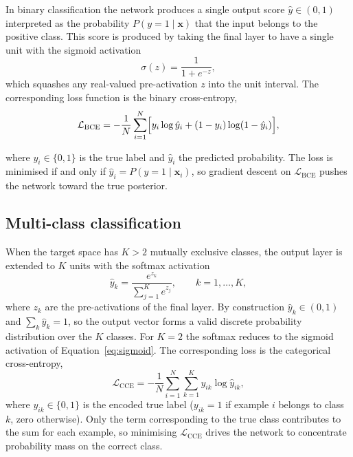 In binary classification the network produces a single output score $\hat{y}\in(0,1)$ interpreted as the probability $P(y=1\mid\mathbf{x})$ that the input belongs to the positive class.  This score is produced by taking the final layer to have a single unit with the sigmoid activation
\begin{equation}
\sigma(z) = \frac{1}{1+e^{-z}},
\label{eq:sigmoid}
\end{equation}
which squashes any real-valued pre-activation $z$ into the unit interval.  The corresponding loss function is the binary cross-entropy,
\begin{equation}
\mathcal{L}_{\mathrm{BCE}} = -\frac{1}{N}\sum_{i=1}^{N} \Bigl[ y_{i}\log\hat{y}_{i} + (1-y_{i})\log(1-\hat{y}_{i}) \Bigr],
\label{eq:bce}
\end{equation}

where $y_i\in\{0,1\}$ is the true label and $\hat{y}_i$ the predicted probability.  The loss is minimised if and only if $\hat{y}_i = P(y=1\mid\mathbf{x}_i)$, so gradient descent on $\mathcal{L}_{\mathrm{BCE}}$ pushes the network toward the true posterior.

\subsection{Multi-class classification}
\label{sec:multiclass}

When the target space has $K>2$ mutually exclusive classes, the output layer is extended to $K$ units with the softmax activation
\begin{equation}
\hat{y}_{k} = \frac{e^{z_{k}}}{\sum_{j=1}^{K}e^{z_{j}}}, \qquad k=1,\dots,K,
\label{eq:softmax}
\end{equation}
where $z_k$ are the pre-activations of the final layer.  By construction $\hat{y}_k\in(0,1)$ and $\sum_k\hat{y}_k=1$, so the output vector forms a valid discrete probability distribution over the $K$ classes.  For $K=2$ the softmax reduces to the sigmoid activation of Equation~\eqref{eq:sigmoid}.  The corresponding loss is the categorical cross-entropy,
\begin{equation}
\mathcal{L}_{\mathrm{CCE}} = -\frac{1}{N}\sum_{i=1}^{N}\sum_{k=1}^{K} y_{ik}\log\hat{y}_{ik},
\label{eq:cce}
\end{equation}
where $y_{ik}\in\{0,1\}$ is the encoded true label ($y_{ik}=1$ if example $i$ belongs to class $k$, zero otherwise).  Only the term corresponding to the true class contributes to the sum for each example, so minimising $\mathcal{L}_{\mathrm{CCE}}$ drives the network to concentrate probability mass on the correct class.

